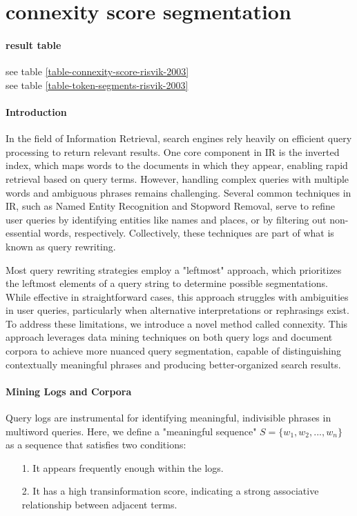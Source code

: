 \section{connexity score segmentation} \label{approach1}

\paragraph{result table}
see table \ref{table-connexity-score-risvik-2003}\\
see table \ref{table-token-segments-risvik-2003}




\paragraph*{Introduction}
In the field of Information Retrieval, search engines rely heavily on efficient query processing to return relevant results. One core component in IR is the inverted index, which maps words to the documents in which they appear, enabling rapid retrieval based on query terms. However, handling complex queries with multiple words and ambiguous phrases remains challenging. Several common techniques in IR, such as Named Entity Recognition and Stopword Removal, serve to refine user queries by identifying entities like names and places, or by filtering out non-essential words, respectively. Collectively, these techniques are part of what is known as query rewriting.

Most query rewriting strategies employ a "leftmost" approach, which prioritizes the leftmost elements of a query string to determine possible segmentations. While effective in straightforward cases, this approach struggles with ambiguities in user queries, particularly when alternative interpretations or rephrasings exist. To address these limitations, we introduce a novel method called connexity. This approach leverages data mining techniques on both query logs and document corpora to achieve more nuanced query segmentation, capable of distinguishing contextually meaningful phrases and producing better-organized search results.

\paragraph*{Mining Logs and Corpora}
Query logs are instrumental for identifying meaningful, indivisible phrases in multiword queries. 
Here, we define a "meaningful sequence" $S = \{w_1,w_2,...,w_n\}$ as a sequence that satisfies two conditions:
\begin{enumerate}
\item[1.] It appears frequently enough within the logs.
\item[2.] It has a high transinformation score, indicating a strong associative relationship between adjacent terms.
\end{enumerate}

